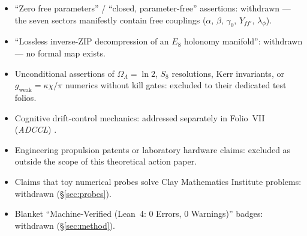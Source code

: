 \documentclass{alienfolio}
\begin{document}
\begin{itemize}
\item ``Zero free parameters'' / ``closed, parameter-free'' assertions:
withdrawn --- the seven sectors manifestly contain free couplings
($\alpha$, $\beta$, $\gamma_0$, $Y_{ff'}$, $\lambda_\phi$).
\item ``Lossless inverse-ZIP decompression of an $E_8$ holonomy
manifold'': withdrawn --- no formal map exists.
\item Unconditional assertions of $\Omega_\Lambda = \ln 2$, $S_8$
resolutions, Kerr invariants, or $g_{\mathrm{weak}} = \kappa\chi/\pi$
numerics without kill gates: excluded to their dedicated test folios.
\item Cognitive drift-control mechanics: addressed separately in
Folio~VII (\emph{ADCCL}) \cite{folio-vii}.
\item Engineering propulsion patents or laboratory hardware claims:
excluded as outside the scope of this theoretical action paper.
\item Claims that toy numerical probes solve Clay Mathematics Institute
problems: withdrawn (\S\ref{sec:probes}).
\item Blanket ``Machine-Verified (Lean~4: 0 Errors, 0 Warnings)''
badges: withdrawn (\S\ref{sec:method}).
\end{itemize}

\goldrule
\end{document}
